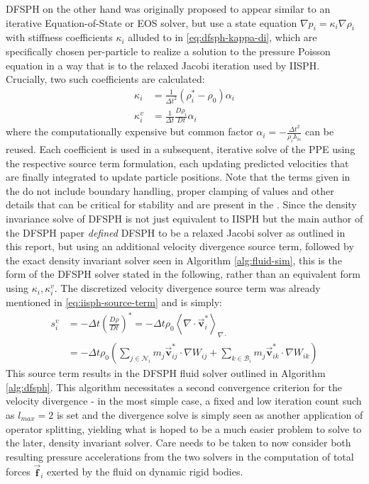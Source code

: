 \documentclass[oneside, a4paper]{book}
\newcommand\angled[1]{\left\langle#1\right\rangle}
\newcommand\vek[1]{\vec{\bm{#1}}}
\newcommand\mat[1]{{\mathds{#1}}}
\newcommand\br[1]{\left(#1\right)}
\newcommand\divergence{{\nabla\cdot}}
\begin{document}
    DFSPH on the other hand was originally proposed to appear similar to an iterative Equation-of-State or EOS solver, but use a state equation $\nabla p_i = \kappa_i\nabla \rho_i$ \autocite{dfsph} with stiffness coefficients $\kappa_i$ alluded to in \autoref{eq:dfsph-kappa-di}, which are specifically chosen per-particle to realize a solution to the pressure Poisson equation in a way that is \autocite[essentially equivalent]{2022-survey-equographics-star} to the relaxed Jacobi iteration used by IISPH. Crucially, two such coefficients are calculated:
    \begin{align}
      \kappa_i &= \frac{1}{\Delta t^2}\br{\rho_i^* - \rho_0}\alpha_i \\
      \kappa_i^v &= \frac{1}{\Delta t}\frac{D \rho_i}{D t}\alpha_i
    \end{align}
    where the computationally expensive but common factor $\alpha_i = -\frac{\Delta t^2}{\rho_i\mat{A}_{ii}}$ can be reused. Each coefficient is used in a subsequent, iterative solve of the PPE using the respective source term formulation, each updating predicted velocities that are finally integrated to update particle positions. Note that the terms given in the \autocite[DFSPH paper]{dfsph} do not include boundary handling, proper clamping of values and other details that can be critical for stability and are present in the \autocite[authors' own implementation]{SPlisHSPlasH_Library}. Since the density invariance solve of DFSPH is not just equivalent to IISPH but the main author of the DFSPH paper \autocite{dfsph} \autocite[in a later paper]{consistent-boundaries} \textit{defined} DFSPH to be a relaxed Jacobi solver as outlined in this report, but using an additional velocity divergence source term, followed by the exact density invariant solver seen in Algorithm \ref{alg:fluid-sim}, this is the form of the DFSPH solver stated in the following, rather than an equivalent form using $\kappa_i, \kappa_i^v$. The discretized velocity divergence source term was already mentioned in \autoref{eq:iisph-source-term} and is simply:
    \begin{align}\label{eq:velocity-divergence-source-term}
      s_i^v &= - \Delta t \br{\frac{D\rho}{D t}}^* =- \Delta t  \rho_0 \angled{\divergence\vek{v}^*_i}_{\divergence} \\
      &= -\Delta t \rho_0  \br{
        \sum_{j\in\mathcal{N}_i} m_j\vek{v}_{ij}^*\cdot \nabla W_{ij}
        + \sum_{k\in\mathcal{B}_i} m_j\vek{v}_{ik}^*\cdot \nabla W_{ik}
      }
    \end{align}
    This source term results in the DFSPH fluid solver outlined in Algorithm \ref{alg:dfsph}. This algorithm necessitates a second convergence criterion for the velocity divergence - in the most simple case, a fixed and low iteration count such as $l_{max} = 2$ is set and the divergence solve is simply seen as another application of operator splitting, yielding what is hoped to be a much easier problem to solve to the later, density invariant solver. Care needs to be taken to now consider both resulting pressure accelerations from the two solvers in the computation of total forces $\vek{f}_i$ exerted by the fluid on dynamic rigid bodies. 
    
\end{document}
